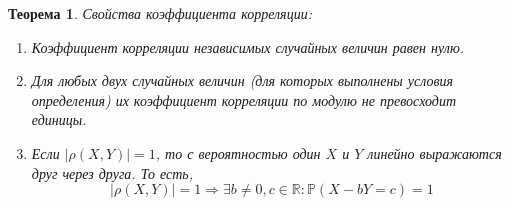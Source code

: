\documentclass[oneside,final,14pt]{extreport}
\newtheorem{thm}{Теорема}[section]
\theoremstyle{definition}
\begin{document}
\begin{thm}
    Свойства коэффициента корреляции:
    \begin{enumerate}
        \item Коэффициент корреляции независимых случайных величин равен нулю.
        \item Для любых двух случайных величин (для которых выполнены условия определения) их коэффициент корреляции по модулю не превосходит единицы.
        \item Если $|\rho(X,Y)| = 1$, то с вероятностью один $X$ и $Y$ линейно выражаются друг через друга. То есть,
        \begin{equation*}
            |\rho(X, Y)|=1 \Longrightarrow \exists b \neq 0, c \in \mathbb{R}: \mathbb{P}(X-b Y=c)=1
        \end{equation*}
    \end{enumerate}
\end{thm}
\end{document}
